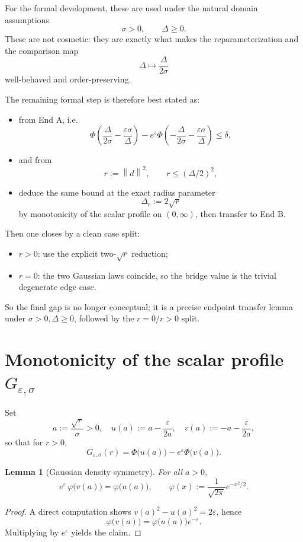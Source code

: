 \documentclass[11pt]{article}
\newcommand{\norm}[1]{\left\lVert #1\right\rVert}
\newcommand{\PhiStd}{\Phi}
\newtheorem{lemma}{Lemma}
\begin{document}
For the formal development, these are used under the natural domain assumptions
\[
\sigma>0,\qquad \Delta\ge 0.
\]
These are not cosmetic: they are exactly what makes the reparameterization and
the comparison map
\[
\Delta \longmapsto \frac{\Delta}{2\sigma}
\]
well-behaved and order-preserving.

The remaining formal step is therefore best stated as:
\begin{itemize}
\item from End A, i.e.
\[
\PhiStd\!\left(\frac{\Delta}{2\sigma}-\frac{\varepsilon\sigma}{\Delta}\right)
-e^\varepsilon
\PhiStd\!\left(-\frac{\Delta}{2\sigma}-\frac{\varepsilon\sigma}{\Delta}\right)
\le \delta,
\]
\item and from
\[
r:=\norm d^2,\qquad r\le (\Delta/2)^2,
\]
\item deduce the same bound at the exact radius parameter
\[
\Delta_r:=2\sqrt r
\]
by monotonicity of the scalar profile on $(0,\infty)$, then transfer to End B.
\end{itemize}

Then one closes by a clean case split:
\begin{itemize}
\item $r>0$: use the explicit two-$\sqrt r$ reduction;
\item $r=0$: the two Gaussian laws coincide, so the bridge value is the trivial
degenerate edge case.
\end{itemize}

So the final gap is no longer conceptual; it is a precise endpoint transfer
lemma under $\sigma>0,\Delta\ge 0$, followed by the $r=0$/$r>0$ split.

\section{Monotonicity of the scalar profile \texorpdfstring{$G_{\varepsilon,\sigma}$}{G}}
Set
\[
a:=\frac{\sqrt r}{\sigma}>0,
\quad
u(a):=a-\frac{\varepsilon}{2a},
\quad
v(a):=-a-\frac{\varepsilon}{2a},
\]
so that for $r>0$,
\[
G_{\varepsilon,\sigma}(r)
=\PhiStd\!\bigl(u(a)\bigr)-e^\varepsilon\PhiStd\!\bigl(v(a)\bigr).
\]

\begin{lemma}[Gaussian density symmetry]\label{lem:density-sym}
For all $a>0$,
\[
e^\varepsilon\,\varphi\!\bigl(v(a)\bigr)=\varphi\!\bigl(u(a)\bigr),
\qquad
\varphi(x):=\frac{1}{\sqrt{2\pi}}e^{-x^2/2}.
\]
\end{lemma}

\begin{proof}
A direct computation shows $v(a)^2-u(a)^2=2\varepsilon$, hence
\[
\varphi\!\bigl(v(a)\bigr)=\varphi\!\bigl(u(a)\bigr)e^{-\varepsilon}.
\]
Multiplying by $e^\varepsilon$ yields the claim.
\end{proof}
\end{document}

